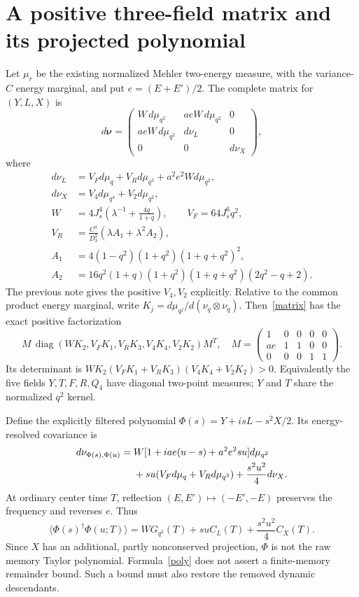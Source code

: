 \documentclass[11pt,a4paper]{article}
\newcommand{\J}{J_s}
\begin{document}
\section{A positive three-field matrix and its projected polynomial}
Let $\mu_r$ be the existing normalized Mehler two-energy measure,
with the variance-$C$ energy marginal, and put $e=(E+E')/2$.
The complete matrix for $(Y,L,X)$ is
\begin{equation}
 d\boldsymbol\nu=
 \begin{pmatrix}
 W\,d\mu_{q^2}&aeW\,d\mu_{q^2}&0\\
 aeW\,d\mu_{q^2}&d\nu_L&0\\
 0&0&d\nu_X
 \end{pmatrix}, \label{matrix}
\end{equation}
where
\begin{align}
 d\nu_L&=V_Fd\mu_q+V_Rd\mu_{q^3}+a^2e^2W d\mu_{q^2},\\
 d\nu_X&=V_4d\mu_{q^4}+V_2d\mu_{q^2},\\
 W&=4\J^4\left(\lambda^{-1}+\frac{4q}{1+q}\right),\qquad
 V_F=64\J^6q^2,\\
 V_R&=\frac{C^3}{D_3^2}(\lambda A_1+\lambda^2 A_2),\\
 A_1&=4(1-q^2)(1+q^2)(1+q+q^2)^2,\\
 A_2&=16q^2(1+q)(1+q^2)(1+q+q^2)(2q^2-q+2).
\end{align}
The previous note gives the positive $V_4,V_2$ explicitly.
Relative to the common product energy marginal, write
$K_j=d\mu_{q^j}/d(\nu_q\otimes\nu_q)$. Then~\eqref{matrix}
has the exact positive factorization
\begin{equation}
 M\,\operatorname{diag}(WK_2,V_FK_1,V_RK_3,V_4K_4,V_2K_2)M^T,
 \quad
 M=\begin{pmatrix}1&0&0&0&0\\ae&1&1&0&0\\0&0&0&1&1\end{pmatrix}.
\end{equation}
Its determinant is $WK_2(V_FK_1+V_RK_3)(V_4K_4+V_2K_2)>0$.
Equivalently the five fields $Y,T,F,R,Q_4$ have diagonal
two-point measures; $Y$ and $T$ share the normalized $q^2$ kernel.

Define the explicitly filtered polynomial
$\Phi(s)=Y+isL-s^2X/2$. Its energy-resolved covariance is
\begin{align}
 d\nu_{\Phi(s),\Phi(u)}={}&
 W[1+iae(u-s)+a^2e^2su]d\mu_{q^2}\notag\\
 &+su(V_Fd\mu_q+V_Rd\mu_{q^3})
 +\frac{s^2u^2}{4}d\nu_X. \label{poly}
\end{align}
At ordinary center time $T$, reflection $(E,E')\mapsto(-E',-E)$
preserves the frequency and reverses $e$. Thus
\begin{equation}
 \langle\Phi(s)^\dagger\Phi(u;T)\rangle
 =WG_{q^2}(T)+suC_L(T)+\frac{s^2u^2}{4}C_X(T).
\end{equation}
Since $X$ has an additional, partly nonconserved projection,
$\Phi$ is not the raw memory Taylor polynomial. Formula~\eqref{poly}
does not assert a finite-memory remainder bound. Such a bound must
also restore the removed dynamic descendants.
\end{document}
